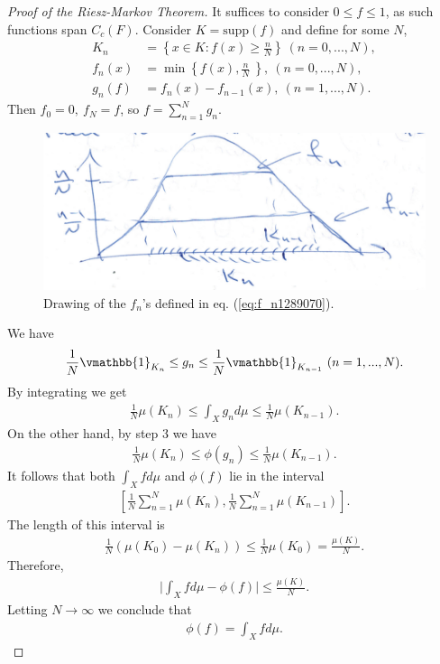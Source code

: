 \begin{proof}[Proof of the Riesz-Markov Theorem]
    It suffices to consider \(0\leq f\leq 1\), as such functions span \(C_c(F)\). Consider \(K=\text{supp}(f)\) and define for some \(N\),
    \begin{align} 
        K_n &= \left\{ x\in K:f(x) \geq \frac{n}{N} \right\} \ (n=0, ..., N), \\ \label{eq:f_n1289070}
        f_n(x) &= \min\left\{f(x), \frac{n}{N} \ \right\}, \ (n=0, ..., N), \\
        g_n(f) &= f_n(x)-f_{n-1}(x),  \ (n=1, ..., N).
    \end{align}
    Then \(f_0 = 0, \ f_N=f\), so \(f=\sum_{n=1}^{N}g_n\).
    \begin{figure}[H]
        \centering 
        \includegraphics[scale=0.5]{Figs/f_ns_proof_RM.png}
        \caption{Drawing of the \(f_n\)'s defined in eq. (\ref{eq:f_n1289070}).}
    \end{figure}
    We have
    \begin{align*}
        \frac{1}{N}\vmathbb{1}_{K_n} \leq g_n \leq \frac{1}{N}\vmathbb{1}_{K_{n-1}} \ (n=1, ..., N).
    \end{align*}
    By integrating we get
    \begin{align*}
        \frac{1}{N}\mu(K_n) \leq \int_X g_n d\mu\leq \frac{1}{N} \mu(K_{n-1}).
    \end{align*}
    On the other hand, by step 3 we have
    \begin{align*}
        \frac{1}{N}\mu(K_n) \leq \phi(g_n) \leq \frac{1}{N} \mu(K_{n-1}).
    \end{align*}
    It follows that both \(\int_X fd\mu\) and \(\phi(f)\) lie in the interval
    \begin{align*}
        \left[\frac{1}{N}\sum\limits_{n=1}^{N}\mu(K_n), \frac{1}{N}\sum\limits_{n=1}^{N}\mu(K_{n-1})\right].
    \end{align*}
    The length of this interval is
    \begin{align*}
        \frac{1}{N}\left(\mu(K_0) - \mu(K_n)\right) \leq \frac{1}{N} \mu(K_0) = \frac{\mu(K)}{N}.
    \end{align*}
    Therefore,
    \begin{align*}
        \Big\vert \int_X fd\mu - \phi(f) \Big\vert \leq \frac{\mu(K)}{N}.
    \end{align*}
    Letting \(N\rightarrow\infty\) we conclude that
    \begin{align*}
        \phi(f) = \int_X fd\mu.
    \end{align*}


\end{proof}
